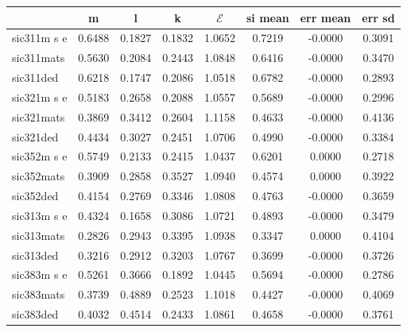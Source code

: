 \begin{tabular}{lccccccc} \toprule
 & m  & l  & k  & $\mathcal{E}$ & si mean  & err mean  & err sd  \\  \hline 
sic311m s e &    0.6488 &    0.1827 &    0.1832 &    1.0652 &    0.7219 &   -0.0000 &    0.3091 \\  
sic311mats &    0.5630 &    0.2084 &    0.2443 &    1.0848 &    0.6416 &   -0.0000 &    0.3470 \\  
sic311ded &    0.6218 &    0.1747 &    0.2086 &    1.0518 &    0.6782 &   -0.0000 &    0.2893 \\  \hline
sic321m s e &    0.5183 &    0.2658 &    0.2088 &    1.0557 &    0.5689 &   -0.0000 &    0.2996 \\  
sic321mats &    0.3869 &    0.3412 &    0.2604 &    1.1158 &    0.4633 &   -0.0000 &    0.4136 \\  
sic321ded &    0.4434 &    0.3027 &    0.2451 &    1.0706 &    0.4990 &   -0.0000 &    0.3384 \\ \hline 
sic352m s e &    0.5749 &    0.2133 &    0.2415 &    1.0437 &    0.6201 &    0.0000 &    0.2718 \\  
sic352mats &    0.3909 &    0.2858 &    0.3527 &    1.0940 &    0.4574 &    0.0000 &    0.3922 \\  
sic352ded &    0.4154 &    0.2769 &    0.3346 &    1.0808 &    0.4763 &   -0.0000 &    0.3659 \\  \hline
sic313m s e &    0.4324 &    0.1658 &    0.3086 &    1.0721 &    0.4893 &   -0.0000 &    0.3479 \\  
sic313mats &    0.2826 &    0.2943 &    0.3395 &    1.0938 &    0.3347 &    0.0000 &    0.4104 \\  
sic313ded &    0.3216 &    0.2912 &    0.3203 &    1.0767 &    0.3699 &   -0.0000 &    0.3726 \\  \hline
sic383m s e &    0.5261 &    0.3666 &    0.1892 &    1.0445 &    0.5694 &   -0.0000 &    0.2786 \\  
sic383mats &    0.3739 &    0.4889 &    0.2523 &    1.1018 &    0.4427 &   -0.0000 &    0.4069 \\  
sic383ded &    0.4032 &    0.4514 &    0.2433 &    1.0861 &    0.4658 &   -0.0000 &    0.3761 \\  
\bottomrule \end{tabular}
